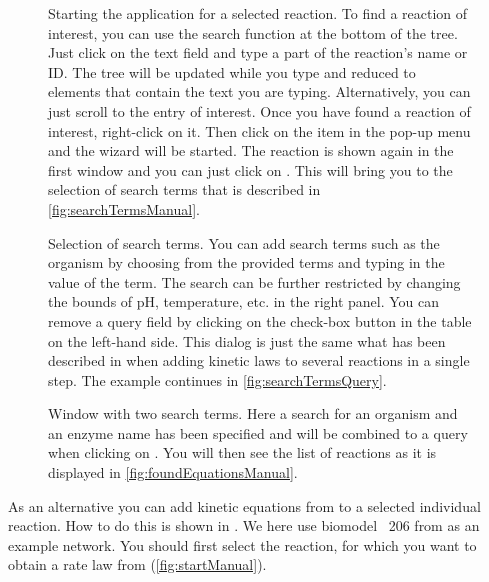 \begin{figure}[t!]
\caption[Starting the \SABIO application for a selected reaction]{Starting the \SABIO application for a selected reaction.
To find a reaction of interest, you can use the search function at the bottom of the \SBML tree.
Just click on the text field and type a part of the reaction's name or \ac{ID}.
The tree will be updated while you type and reduced to elements that contain the text you are typing.
Alternatively, you can just scroll to the entry of interest.
Once you have found a reaction of interest, right-click on it.
Then click on the \SABIO item in the pop-up menu and the \SABIO wizard will be started.
The reaction is shown again in the first window and you can just click on .
This will bring you to the selection of search terms that is described in \vref{fig:searchTermsManual}.}
\label{fig:startManual}
\end{figure}
\begin{figure}
\caption[Selection of search terms]{Selection of search terms.
You can add search terms such as the organism by choosing from the provided terms and
typing in the value of the term. The search can be further restricted by changing the
bounds of pH, temperature, etc. in the right panel. 
You can remove a query field by clicking on the check-box button in the table on the left-hand side.
This dialog is just the same what has been described in  when adding kinetic laws to several reactions in a single step.
The example continues in \vref{fig:searchTermsQuery}.}
\label{fig:searchTermsManual}
\end{figure}
\begin{figure}
\caption[Window with two search terms]{Window with two search terms.
Here a search for an organism and an enzyme name has been specified and will be
combined to a query when clicking on .
You will then see the list of reactions as it is displayed in \vref{fig:foundEquationsManual}.}
\label{fig:searchTermsQuery}
\end{figure}
As an alternative you can add kinetic equations from \SABIO to a selected individual reaction.
How to do this is shown in .
We here use biomodel \numero~206 from \BioModels \citep{Li2010a, Wolf2000} as an example network.
You should first select the reaction, for which you want to obtain a rate law from \SABIO (\vref{fig:startManual}).
